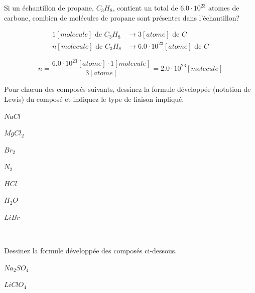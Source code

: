 \documentclass[
  11pt,
  a4paper,
  openany]{book}
\begin{document}
\begin{Exercise}

Si un échantillon de propane, \(C_3H_8\), contient un total de \(6.0 \cdot 10^{23}\) atomes de carbone, combien de molécules de propane sont présentes dans l'échantillon?


\end{Exercise}

\begin{Answer}
\[ \begin{split}
  1 [molecule] \text{ de } C_3H_8 & \longrightarrow 3 [atome] \text{ de }  C \\
  n [molecule] \text{ de } C_3H_8 & \longrightarrow 6.0 \cdot 10^{23} [atome] \text{ de } C
  \end{split} \]

\[ n = \frac{6.0 \cdot 10^{23} [atome] \cdot 1 [molecule]}{3 [atome]} = 2.0 \cdot 10^{23} [molecule] \]

\end{Answer}

\newpage

\begin{Exercise}

Pour chacun des composés suivants, dessinez la formule développée (notation de Lewis) du composé et indiquez le type de liaison impliqué.

\begin{multicols}{4}
\(NaCl\)

\(MgCl_2\)

\(Br_2\)

\(N_2\)

\end{multicols}


\begin{multicols}{4}
\(HCl\)

\(H_2O\)

\(LiBr\)

~

\end{multicols}


\end{Exercise}

\begin{Exercise}

Dessinez la formule développée des composés ci-dessous.

\begin{multicols}{2}
\(Na_2SO_4\)

\(LiClO_4\)

\end{multicols}


\end{Exercise}
\end{document}
